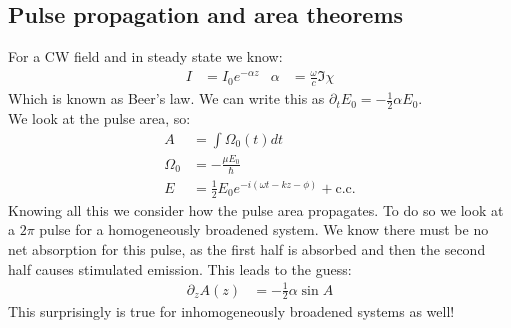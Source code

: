 \subsection{Pulse propagation and area theorems}
For a CW field and in steady state we know:
\begin{align*}
	I &= I_0 e^{-\alpha z} &
	\alpha &= \frac{\omega}{c} \Im\chi
\end{align*}
Which is known as Beer's law. We can write this as $\partial_t E_0 = -\frac{1}{2}\alpha E_0$. \\
We look at the pulse area, so:
\begin{align*}
	A &= \int\Omega_0(t) dt \\
	\Omega_0 &= -\frac{\mu E_0}{\hbar} \\
	E &= \frac{1}{2} E_0 e^{-i(\omega t - kz - \phi)} + \text{c.c.}
\end{align*}
Knowing all this we consider how the pulse area propagates. To do so we look at a $2\pi$ pulse for a homogeneously broadened system.
We know there must be no net absorption for this pulse, as the first half is absorbed and then the second half causes stimulated emission. This leads to the guess:
\begin{align*}
	\partial_z A(z) &= -\frac{1}{2}\alpha\sin A
\end{align*}
This surprisingly is true for inhomogeneously broadened systems as well!

